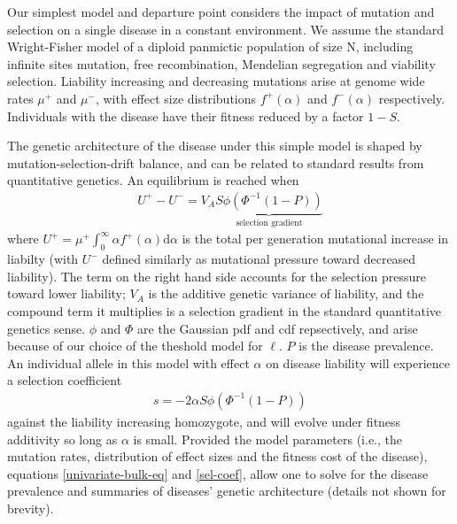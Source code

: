 \documentclass[11pt]{article}
\begin{document}
Our simplest model and departure point considers the impact of mutation and selection on a single disease in a constant environment. We assume the standard Wright-Fisher model of a diploid panmictic population of size N, including infinite sites mutation, free recombination, Mendelian segregation and viability selection. Liability increasing and decreasing mutations arise at genome wide rates $\mu^+$ and $\mu^-$, with effect size distributions $f^+\left(\alpha\right)$ and $f^-\left(\alpha\right)$ respectively. Individuals with the disease have their fitness reduced by a factor $1-S$.

The genetic architecture of the disease under this simple model is shaped by mutation-selection-drift balance, and can be related to standard results from quantitative genetics. An equilibrium is reached when 
\begin{align}
  U^+ - U^- = V_A \underbrace{S\phi\left(\Phi^{-1}\left(1-P\right)\right)}_{\text{selection gradient}}
  \label{univariate-bulk-eq}
\end{align}
where $U^+ = \mu^+\int_{0}^{\infty}\alpha f^+\left(\alpha\right)\mathrm{d}\alpha$ is the total per generation mutational increase in liabilty (with $U^-$ defined similarly as mutational pressure toward decreased liability). The term on the right hand side accounts for the selection pressure toward lower liability; $V_A$ is the additive genetic variance of liability, and the compound term it multiplies is a selection gradient in the standard quantitative genetics sense.\cite{Charlesworth} $\phi$ and $\Phi$ are the Gaussian pdf and cdf repsectively, and arise because of our choice of the theshold model for $\ell$.  $P$ is the disease prevalence.  An individual allele in this model with effect $\alpha$ on disease liability will experience a selection coefficient
\begin{align}
  s = -2\alpha S\phi\left(\Phi^{-1}\left(1-P\right)\right)
  \label{sel-coef}
\end{align}
against the liability increasing homozygote, and will evolve under fitness additivity so long as $\alpha$ is small.
Provided the model parameters  (i.e., the mutation rates, distribution of effect sizes and the fitness cost of the disease), equations \eqref{univariate-bulk-eq} and \eqref{sel-coef}, allow one to solve for the disease prevalence and summaries of diseases' genetic architecture (details not shown for brevity).

\end{document}
